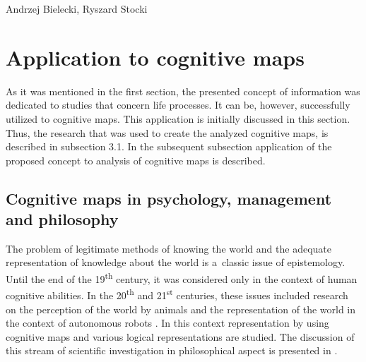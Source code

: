 \begin{artengenv2auth}{Andrzej Bielecki, Ryszard Stocki}
\section{Application to cognitive maps}

As it was mentioned in the first section, the presented concept of information was dedicated to studies that concern life processes. It can be, however, successfully utilized to cognitive maps. This application is initially discussed in this section. Thus, the research that was used to create the analyzed cognitive maps, is described in subsection 3.1. In the subsequent subsection application of the proposed concept to analysis of cognitive maps is described.



\subsection{Cognitive maps in psychology, management and philosophy}



The problem of legitimate methods of knowing the world and the adequate representation of knowledge about the world is a~classic issue of epistemology. Until the end of the 19\textsuperscript{th} century, it was considered only in the context of human cognitive abilities. In the 20\textsuperscript{th} and 21\textsuperscript{st} centuries, these issues included research on the perception of the world by animals and the representation of the world in the context of autonomous robots 
\parencite[see.g][]{bielecki_systemic_2021}. %
 In this context representation by using cognitive maps and various logical representations are studied. The discussion of this stream of scientific investigation in philosophical aspect is presented in 
\parencite[][]{rescorla_cognitive_2009}.%





\end{artengenv2auth}
